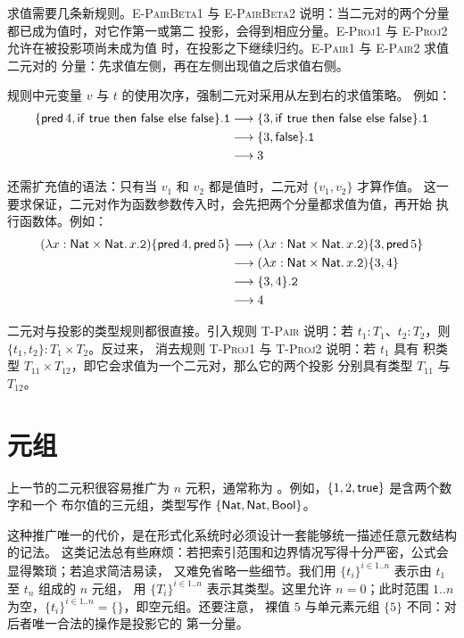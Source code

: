 求值需要几条新规则。\textsc{E-PairBeta1} 与
\textsc{E-PairBeta2} 说明：当二元对的两个分量都已成为值时，对它作第一或第二
投影，会得到相应分量。\textsc{E-Proj1} 与 \textsc{E-Proj2} 允许在被投影项尚未成为值
时，在投影之下继续归约。\textsc{E-Pair1} 与 \textsc{E-Pair2} 求值二元对的
分量：先求值左侧，再在左侧出现值之后求值右侧。

规则中元变量 \(v\) 与 \(t\) 的使用次序，强制二元对采用从左到右的求值策略。
例如：
\[
\begin{aligned}
\{\mathsf{pred}\,4,\mathsf{if}\ \mathsf{true}\ \mathsf{then}\ \mathsf{false}\ \mathsf{else}\ \mathsf{false}\}.\mathtt{1}
&\mathrel{\longrightarrow}\{3,\mathsf{if}\ \mathsf{true}\ \mathsf{then}\ \mathsf{false}\ \mathsf{else}\ \mathsf{false}\}.\mathtt{1}\\
&\mathrel{\longrightarrow}\{3,\mathsf{false}\}.\mathtt{1}\\
&\mathrel{\longrightarrow}3
\end{aligned}
\]

还需扩充值的语法：只有当 \(v_1\) 和 \(v_2\) 都是值时，二元对 \(\{v_1,v_2\}\) 才算作值。
这一要求保证，二元对作为函数参数传入时，会先把两个分量都求值为值，再开始
执行函数体。例如：
\[
\begin{aligned}
(\lambda x:\mathsf{Nat}\times\mathsf{Nat}.\,x.\mathtt{2})
 \{\mathsf{pred}\,4,\mathsf{pred}\,5\}
&\mathrel{\longrightarrow}(\lambda x:\mathsf{Nat}\times\mathsf{Nat}.\,x.\mathtt{2})
 \{3,\mathsf{pred}\,5\}\\
&\mathrel{\longrightarrow}(\lambda x:\mathsf{Nat}\times\mathsf{Nat}.\,x.\mathtt{2})
 \{3,4\}\\
&\mathrel{\longrightarrow}\{3,4\}.\mathtt{2}\\
&\mathrel{\longrightarrow}4
\end{aligned}
\]

二元对与投影的类型规则都很直接。引入规则 \textsc{T-Pair} 说明：若
\(t_1:T_1\)、\(t_2:T_2\)，则 \(\{t_1,t_2\}:T_1\times T_2\)。反过来，
消去规则 \textsc{T-Proj1} 与 \textsc{T-Proj2} 说明：若 \(t_1\) 具有
积类型 \(T_{11}\times T_{12}\)，即它会求值为一个二元对，那么它的两个投影
分别具有类型 \(T_{11}\) 与 \(T_{12}\)。

\section{元组}
\label{sec:11.7}

上一节的二元积很容易推广为 \(n\) 元积，通常称为
。例如，\(\{1,2,\mathsf{true}\}\) 是含两个数字和一个
布尔值的三元组，类型写作
\(\{\mathsf{Nat},\mathsf{Nat},\mathsf{Bool}\}\)。

这种推广唯一的代价，是在形式化系统时必须设计一套能够统一描述任意元数结构的记法。
这类记法总有些麻烦：若把索引范围和边界情况写得十分严密，公式会显得繁琐；若追求简洁易读，
又难免省略一些细节。我们用
\(\{t_i\}^{i\in1..n}\) 表示由 \(t_1\) 至 \(t_n\) 组成的 \(n\) 元组，
用 \(\{T_i\}^{i\in1..n}\) 表示其类型。这里允许 \(n=0\)；此时范围
\(1..n\) 为空，\(\{t_i\}^{i\in1..n}=\{\}\)，即空元组。还要注意，
裸值 \(5\) 与单元素元组 \(\{5\}\) 不同：对后者唯一合法的操作是投影它的
第一分量。

